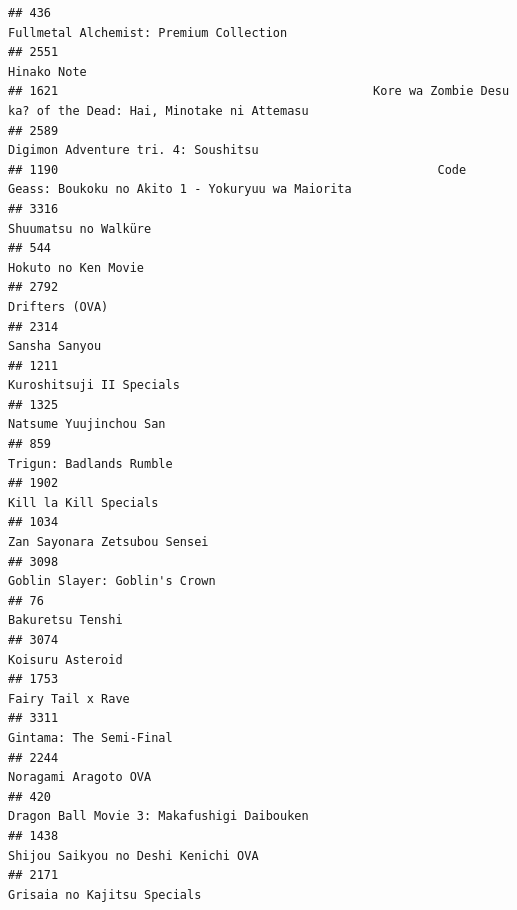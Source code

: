 \documentclass[
]{article}
\begin{document}
\begin{verbatim}
## 436                                                                    Fullmetal Alchemist: Premium Collection
## 2551                                                                                               Hinako Note
## 1621                                            Kore wa Zombie Desu ka? of the Dead: Hai, Minotake ni Attemasu
## 2589                                                                       Digimon Adventure tri. 4: Soushitsu
## 1190                                                     Code Geass: Boukoku no Akito 1 - Yokuryuu wa Maiorita
## 3316                                                                                      Shuumatsu no Walküre
## 544                                                                                        Hokuto no Ken Movie
## 2792                                                                                            Drifters (OVA)
## 2314                                                                                             Sansha Sanyou
## 1211                                                                                  Kuroshitsuji II Specials
## 1325                                                                                    Natsume Yuujinchou San
## 859                                                                                    Trigun: Badlands Rumble
## 1902                                                                                     Kill la Kill Specials
## 1034                                                                              Zan Sayonara Zetsubou Sensei
## 3098                                                                             Goblin Slayer: Goblin's Crown
## 76                                                                                            Bakuretsu Tenshi
## 3074                                                                                          Koisuru Asteroid
## 1753                                                                                         Fairy Tail x Rave
## 3311                                                                                   Gintama: The Semi-Final
## 2244                                                                                      Noragami Aragoto OVA
## 420                                                                 Dragon Ball Movie 3: Makafushigi Daibouken
## 1438                                                                       Shijou Saikyou no Deshi Kenichi OVA
## 2171                                                                               Grisaia no Kajitsu Specials

\end{verbatim}
\end{document}
